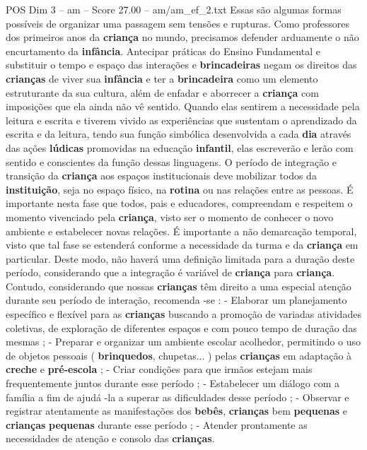 \begin{textsample}{POS Dim 3 – am – Score 27.00 – am/am\_ef\_2.txt}
Essas são algumas formas possíveis de organizar uma passagem sem tensões e rupturas.
Como professores dos primeiros anos da \textbf{criança} no mundo, precisamos defender arduamente o não encurtamento da \textbf{infância}.
Antecipar práticas do Ensino Fundamental e substituir o tempo e espaço das interações e \textbf{brincadeiras} negam os direitos das \textbf{crianças} de viver sua \textbf{infância} e ter a \textbf{brincadeira} como um elemento estruturante da sua cultura, além de enfadar e aborrecer a \textbf{criança} com imposições que ela ainda não vê sentido.
Quando elas sentirem a necessidade pela leitura e escrita e tiverem vivido as experiências que sustentam o aprendizado da escrita e da leitura, tendo sua função simbólica desenvolvida a cada \textbf{dia} através das ações \textbf{lúdicas} promovidas na educação \textbf{infantil}, elas escreverão e lerão com sentido e conscientes da função dessas linguagens.
O período de integração e transição da \textbf{criança} aos espaços institucionais deve mobilizar todos da \textbf{instituição}, seja no espaço físico, na \textbf{rotina} ou nas relações entre as pessoas.
É importante nesta fase que todos, pais e educadores, compreendam e respeitem o momento vivenciado pela \textbf{criança}, visto ser o momento de conhecer o novo ambiente e estabelecer novas relações.
É importante a não demarcação temporal, visto que tal fase se estenderá conforme a necessidade da turma e da \textbf{criança} em particular.
Deste modo, não haverá uma definição limitada para a duração deste período, considerando que a integração é variável de \textbf{criança} para \textbf{criança}.
Contudo, considerando que nossas \textbf{crianças} têm direito a uma especial atenção durante seu período de interação, recomenda -se : - Elaborar um planejamento específico e flexível para as \textbf{crianças} buscando a promoção de variadas atividades coletivas, de exploração de diferentes espaços e com pouco tempo de duração das mesmas ; - Preparar e organizar um ambiente escolar acolhedor, permitindo o uso de objetos pessoais ( \textbf{brinquedos}, chupetas... ) pelas \textbf{crianças} em adaptação à \textbf{creche} e \textbf{pré-escola} ; - Criar condições para que irmãos estejam mais frequentemente juntos durante esse período ; - Estabelecer um diálogo com a família a fim de ajudá -la a superar as dificuldades desse período ; - Observar e registrar atentamente as manifestações dos \textbf{bebês}, \textbf{crianças} bem \textbf{pequenas} e \textbf{crianças} \textbf{pequenas} durante esse período ; - Atender prontamente as necessidades de atenção e consolo das \textbf{crianças}.

\end{textsample}
